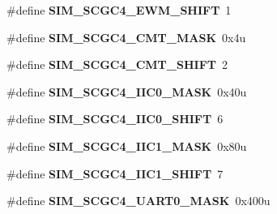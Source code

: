 \begin{DoxyCompactItemize}
\item 
\hypertarget{group___s_i_m___register___masks_gabb62a44b4428fe9b594449f256278785}{}\#define {\bfseries S\+I\+M\+\_\+\+S\+C\+G\+C4\+\_\+\+E\+W\+M\+\_\+\+S\+H\+I\+F\+T}~1\label{group___s_i_m___register___masks_gabb62a44b4428fe9b594449f256278785}

\item 
\hypertarget{group___s_i_m___register___masks_ga9511253ca2efb3add3f216b07a2af5f2}{}\#define {\bfseries S\+I\+M\+\_\+\+S\+C\+G\+C4\+\_\+\+C\+M\+T\+\_\+\+M\+A\+S\+K}~0x4u\label{group___s_i_m___register___masks_ga9511253ca2efb3add3f216b07a2af5f2}

\item 
\hypertarget{group___s_i_m___register___masks_ga86a5e7e5d0367e60bf1cccefec02f6ec}{}\#define {\bfseries S\+I\+M\+\_\+\+S\+C\+G\+C4\+\_\+\+C\+M\+T\+\_\+\+S\+H\+I\+F\+T}~2\label{group___s_i_m___register___masks_ga86a5e7e5d0367e60bf1cccefec02f6ec}

\item 
\hypertarget{group___s_i_m___register___masks_gac63641e776bf519e8969b72162d702f1}{}\#define {\bfseries S\+I\+M\+\_\+\+S\+C\+G\+C4\+\_\+\+I\+I\+C0\+\_\+\+M\+A\+S\+K}~0x40u\label{group___s_i_m___register___masks_gac63641e776bf519e8969b72162d702f1}

\item 
\hypertarget{group___s_i_m___register___masks_ga7084acdc6770ec3b879d6585a620edb7}{}\#define {\bfseries S\+I\+M\+\_\+\+S\+C\+G\+C4\+\_\+\+I\+I\+C0\+\_\+\+S\+H\+I\+F\+T}~6\label{group___s_i_m___register___masks_ga7084acdc6770ec3b879d6585a620edb7}

\item 
\hypertarget{group___s_i_m___register___masks_gae792bc213c9f7d0866769784bdf98e23}{}\#define {\bfseries S\+I\+M\+\_\+\+S\+C\+G\+C4\+\_\+\+I\+I\+C1\+\_\+\+M\+A\+S\+K}~0x80u\label{group___s_i_m___register___masks_gae792bc213c9f7d0866769784bdf98e23}

\item 
\hypertarget{group___s_i_m___register___masks_gaa4bd58e1dac4be06fe691618375865f4}{}\#define {\bfseries S\+I\+M\+\_\+\+S\+C\+G\+C4\+\_\+\+I\+I\+C1\+\_\+\+S\+H\+I\+F\+T}~7\label{group___s_i_m___register___masks_gaa4bd58e1dac4be06fe691618375865f4}

\item 
\hypertarget{group___s_i_m___register___masks_ga8fc8faeefc38393c83454ceba120d5df}{}\#define {\bfseries S\+I\+M\+\_\+\+S\+C\+G\+C4\+\_\+\+U\+A\+R\+T0\+\_\+\+M\+A\+S\+K}~0x400u\label{group___s_i_m___register___masks_ga8fc8faeefc38393c83454ceba120d5df}


\end{DoxyCompactItemize}
